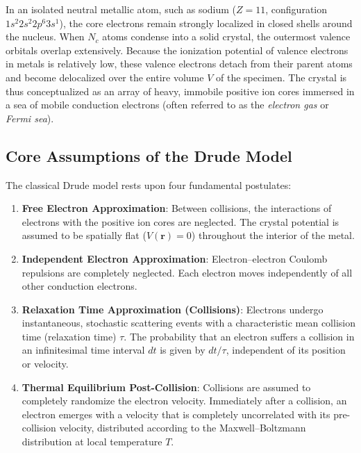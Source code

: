 \documentclass[11pt,a4paper]{article}
\newcommand{\vb}[1]{\mathbf{#1}}
\begin{document}
In an isolated neutral metallic atom, such as sodium ($Z=11$, configuration $1s^2 2s^2 2p^6 3s^1$), the core electrons remain strongly localized in closed shells around the nucleus. When $N_c$ atoms condense into a solid crystal, the outermost valence orbitals overlap extensively. Because the ionization potential of valence electrons in metals is relatively low, these valence electrons detach from their parent atoms and become delocalized over the entire volume $V$ of the specimen. The crystal is thus conceptualized as an array of heavy, immobile positive ion cores immersed in a sea of mobile conduction electrons (often referred to as the \emph{electron gas} or \emph{Fermi sea}).

\subsection{Core Assumptions of the Drude Model}
The classical Drude model rests upon four fundamental postulates:
\begin{enumerate}[leftmargin=*]
    \item \textbf{Free Electron Approximation}: Between collisions, the interactions of electrons with the positive ion cores are neglected. The crystal potential is assumed to be spatially flat ($V(\vb{r}) = 0$) throughout the interior of the metal.
    \item \textbf{Independent Electron Approximation}: Electron--electron Coulomb repulsions are completely neglected. Each electron moves independently of all other conduction electrons.
    \item \textbf{Relaxation Time Approximation (Collisions)}: Electrons undergo instantaneous, stochastic scattering events with a characteristic mean collision time (relaxation time) $\tau$. The probability that an electron suffers a collision in an infinitesimal time interval $dt$ is given by $dt/\tau$, independent of its position or velocity.
    \item \textbf{Thermal Equilibrium Post-Collision}: Collisions are assumed to completely randomize the electron velocity. Immediately after a collision, an electron emerges with a velocity that is completely uncorrelated with its pre-collision velocity, distributed according to the Maxwell--Boltzmann distribution at local temperature $T$.
\end{enumerate}
\end{document}
